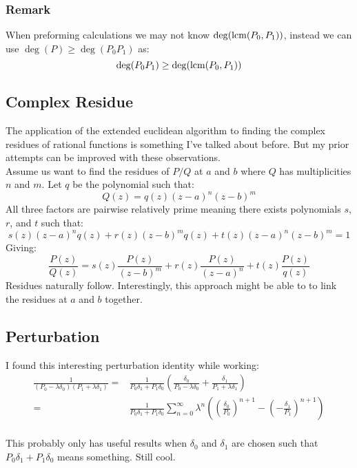\subsubsection{Remark}
When preforming calculations we may not know $\deg(\operatorname{lcm}(P_0,P_1))$,
instead we can use $\deg(P) \geq \deg(P_0P_1)$ as:
\[\deg(P_0P_1) \geq \deg(\operatorname{lcm}(P_0,P_1))\]

\subsection{Complex Residue}
The application of the extended euclidean algorithm to finding the complex residues of rational functions is something I've talked about before.
But my prior attempts can be improved with these observations.
\\

Assume us want to find the residues of $P/Q$ at $a$ and $b$ where $Q$ has multiplicities $n$ and $m$.
Let $q$ be the polynomial such that:
\[Q(z) = q(z)(z-a)^n(z-b)^m\]
All three factors are pairwise relatively prime meaning there exists polynomials $s$,$r$, and $t$ such that:
\[s(z)(z-a)^nq(z)+r(z)(z-b)^mq(z)+t(z)(z-a)^n(z-b)^m = 1\]
Giving:
\[\frac{P(z)}{Q(z)} = s(z)\frac{P(z)}{(z-b)^m}+r(z)\frac{P(z)}{(z-a)^n}+t(z)\frac{P(z)}{q(z)}\]
Residues naturally follow.
Interestingly,
this approach might be able to to link the residues at $a$ and $b$ together.

\subsection{Perturbation}
I found this interesting perturbation identity while working:
\begin{equation*}
\begin{aligned}
	\frac{1}{(P_0-\lambda \delta_0)(P_1+\lambda \delta_1)} =& \frac{1}{P_0\delta_1+P_1\delta_0}\left(\frac{\delta_0}{P_0-\lambda \delta_0}+\frac{\delta_1}{P_1+\lambda \delta_1}\right)\\
	=&\frac{1}{P_0\delta_1+P_1\delta_0}\sum_{n=0}^{\infty}\lambda^n\left(\left(\frac{\delta_0}{P_0}\right)^{n+1}-\left(-\frac{\delta_1}{P_1}\right)^{n+1}\right)\\
\end{aligned}
\end{equation*}

This probably only has useful results when $\delta_0$ and $\delta_1$ are chosen such that $P_0\delta_1+P_1\delta_0$ means something.
Still cool.
